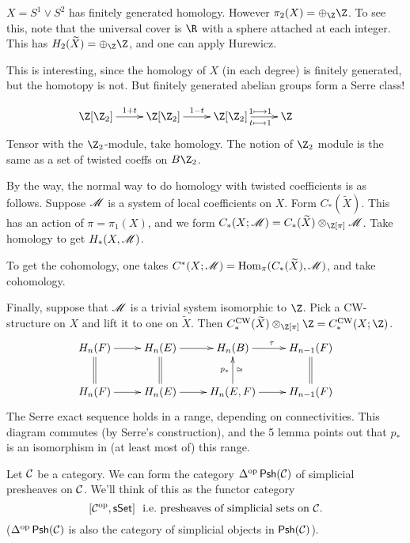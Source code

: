 \documentclass[11pt]{article}
\begin{document}
\begin{FirstTen}
$X=S^1\vee S^2$ has finitely generated homology. However $\pi_2(X)=\oplus_\Z\Z$.
To see this, note that the universal cover is $\R$ with a sphere attached at
each integer. This has $H_2(\widetilde X)=\oplus_\Z\Z$, and one can apply
Hurewicz.

This is interesting, since the homology of $X$ (in each degree) is finitely
generated, but the homotopy is not. But finitely generated abelian groups form a
Serre class!

\[\xymatrix{
\Z[\Z_2]\ar[r]^{1+t}&
\Z[\Z_2]\ar[r]^{1-t}&
\Z[\Z_2]\ar[r]^{1\shortmapsto 1}_{t\shortmapsto1}&
\Z\ \ &\\
}\]
Tensor with the $\Z_2$-module, take homology.
The notion of $\Z_2$ module is the same as a set of twisted coeffs
on $B\Z_2$.

By the way, the normal way to do homology with twisted coefficients is as
follows.
Suppose $\mathscr{M}$ is a system of local coefficients on $X$. Form $C_*(\widetilde
X)$. This has an action of $\pi=\pi_1(X)$, and we form
$C_*(X;\scrM)=C_*(\widetilde X)\otimes_{\Z[\pi]}\scrM$. Take homology to get
$H_*(X,\mathscr{M})$.

To get the cohomology, one takes $C^*(X;\mathscr{M})=\operatorname{Hom}_{\pi}(C_*(\widetilde
X),\mathscr{M})$, and take cohomology.

Finally, suppose that $\mathscr{M}$ is a trivial system isomorphic to $\Z$. Pick a
CW-structure on $X$ and lift it to one on $\widetilde X$. Then
$C^\text{CW}_*(\widetilde X)\otimes_{\Z[\pi]}\Z=C^\text{CW}_*(X;\Z)$.
\[\xymatrix{
H_n(F)\ar[r]&H_n(E)\ar[r]&H_n(B)\ar[r]^\tau&H_{n-1}(F)\\
H_n(F)\ar[r]\ar@{=}[u]&H_n(E)\ar[r]\ar@{=}[u]&
H_n(E,F)\ar[r]\ar[u]^{p_*}_\cong&H_{n-1}(F)\ar@{=}[u]
}\]
The Serre exact sequence holds in a range, depending on connectivities. This
diagram commutes (by Serre's construction), and the 5 lemma points out that
$p_*$ is an isomorphism in (at least most of) this range.
\end{FirstTen}


Let $\mathcal{C}$ be a category. We can form the category $\Delta^{\textup{op}}\operatorname{{\mathsf{Psh}}}(\mathcal{C})$ of simplicial presheaves on $\mathcal{C}$. We'll think of this as the functor category
\[[\mathcal{C}^{\textup{op}},\operatorname{{\mathsf{sSet}}}]\text{ \ i.e.\ presheaves of simplicial sets on $\mathcal{C}$.}\]
($\Delta^{\textup{op}}\operatorname{{\mathsf{Psh}}}(\mathcal{C})$ is also the category of simplicial objects in $\operatorname{{\mathsf{Psh}}}(\mathcal{C})$).
\end{document}
